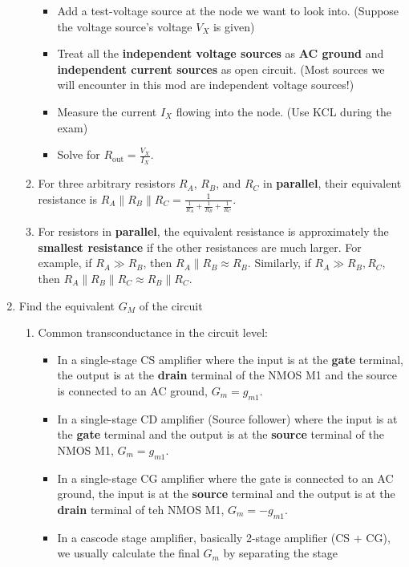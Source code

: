 \documentclass[10pt, landscape]{article}
\begin{document}
\begin{multicols}{4}
\begin{enumerate}
\begin{enumerate}
\begin{itemize}
            \item Add a test-voltage source at the node we want to look into. (Suppose the voltage source's voltage $V_X$ is given)
            \item Treat all the \textbf{independent voltage sources} as \textbf{AC ground} and \textbf{independent current sources} as open circuit. (Most sources we will encounter in this mod are independent voltage sources!)
            \item Measure the current $I_X$ flowing into the node. (Use KCL during the exam)
            \item Solve for $R_{\text{out}}=\frac{V_X}{I_X}$.
        \end{itemize}
        \item For three arbitrary resistors $R_A$, $R_B$, and $R_C$ in \textbf{parallel}, their equivalent resistance is $R_A \parallel R_B \parallel R_C = \frac{1}{\frac{1}{R_A}+\frac{1}{R_B}+\frac{1}{R_C}}$.
        \item For resistors in \textbf{parallel}, the equivalent resistance is approximately the \textbf{smallest resistance} if the other resistances are much larger. For example, if $R_A \gg R_B$, then $R_A \parallel R_B \approx R_B$. Similarly, if $R_A \gg R_B, R_C$, then $R_A \parallel R_B \parallel R_C \approx R_B \parallel R_C$.
    \end{enumerate}
    \item Find the equivalent $G_M$ of the circuit
    \begin{enumerate}
        \item Common transconductance in the circuit level:
        \begin{itemize}
            \item In a single-stage CS amplifier where the input is at the \textbf{gate} terminal, the output is at the \textbf{drain} terminal of the NMOS M1 and the source is connected to an AC ground, $G_m=g_{m1}$.
            \item In a single-stage CD amplifier (Source follower) where the input is at the \textbf{gate} terminal and the output is at the \textbf{source} terminal of the NMOS M1, $G_m=g_{m1}$.
            \item In a single-stage CG amplifier where the gate is connected to an AC ground, the input is at the \textbf{source} terminal and the output is at the \textbf{drain} terminal of teh NMOS M1, $G_m=-g_{m1}$.
            \item In a cascode stage amplifier, basically 2-stage amplifier (CS + CG), we usually calculate the final $G_m$ by separating the stage

\end{itemize}
\end{enumerate}
\end{enumerate}
\end{multicols}
\end{document}
